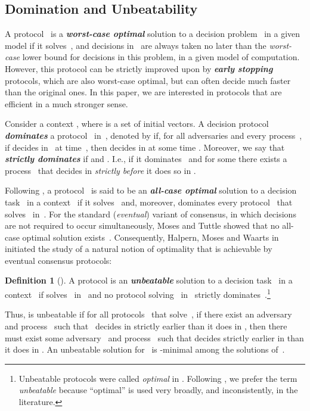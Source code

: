\documentclass[11pt]{article}
\theoremstyle{definition}
\newtheorem{definition}{Definition}
\newcommand{\defemph}[1]{\textbf{\textit{#1}}}
\begin{document}
\subsection{Domination and Unbeatability}

A protocol~ is a \defemph{worst-case optimal} solution to a decision problem~ in a given model
if it solves~, and decisions in~ are always taken no later than the {\em worst-case} lower bound for decisions in this problem, in a given model of computation.
However, this protocol can be strictly improved upon by \defemph{early stopping} protocols,
which are also worst-case optimal, but can often decide much faster than the original ones.
In this paper, we are interested in protocols that are efficient in a much stronger sense.

Consider a  context , where  is a set of initial vectors.
A decision protocol  \defemph{dominates} a protocol~ in~, denoted by  if, for all adversaries  and every process~,
if  decides in~ at time~, then  decides in  at some time
. Moreover, we say that   \defemph{strictly dominates} 
if  and  . I.e., if it dominates~ and for some  there exists a process~ that decides in  {\em strictly before} it does so in .

Following \cite{HMT11},
a protocol~ is said to be an  \defemph{all-case optimal} solution to a decision task~ in a context~ if it solves~ and, moreover,  dominates every protocol~ that solves~ in~.
For the standard ({\em eventual}) variant of consensus, in which decisions are not required to occur simultaneously, Moses and Tuttle showed that no all-case optimal solution exists~\cite{MT}.
Consequently, Halpern, Moses and Waarts in \cite{HalMoWa2001} initiated the study of a natural notion of optimality
that is achievable by eventual consensus protocols:

\begin{definition}[\cite{HalMoWa2001}]
A protocol  is an \defemph{unbeatable} solution to a decision task~ in a context~ if  solves~ in~ and no protocol  solving~ in~ strictly dominates~.\footnote{Unbeatable protocols were called {\em optimal} in \cite{HalMoWa2001}. Following \cite{AYY-DISC},
we prefer the term {\em unbeatable} because ``optimal'' is used very broadly, and inconsistently, in the literature.}
\end{definition}

Thus,  is unbeatable if for all protocols~ that solve~, if there exist an adversary~ and process~ such that~
decides in  strictly earlier than it does in , then there must exist some adversary~ and process~ such that  decides strictly earlier in  than it does in . An unbeatable solution for~ is -minimal among the solutions of~.
\end{document}
